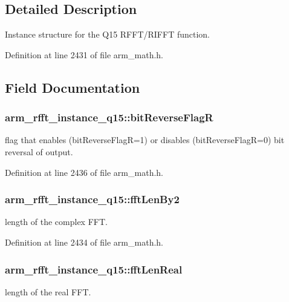 \subsection{Detailed Description}
Instance structure for the Q15 R\-F\-F\-T/\-R\-I\-F\-F\-T function. 

Definition at line 2431 of file arm\-\_\-math.\-h.



\subsection{Field Documentation}
\hypertarget{structarm__rfft__instance__q15_a4c65cd40e0098ec2f5c0dc31488b9bc6}{
\subsubsection[{bit\-Reverse\-Flag\-R}]{ arm\-\_\-rfft\-\_\-instance\-\_\-q15\-::bit\-Reverse\-Flag\-R}}\label{structarm__rfft__instance__q15_a4c65cd40e0098ec2f5c0dc31488b9bc6}
flag that enables (bit\-Reverse\-Flag\-R=1) or disables (bit\-Reverse\-Flag\-R=0) bit reversal of output. 

Definition at line 2436 of file arm\-\_\-math.\-h.

\hypertarget{structarm__rfft__instance__q15_afef95bc722f5929d5e63ecba14fa3ca1}{
\subsubsection[{fft\-Len\-By2}]{ arm\-\_\-rfft\-\_\-instance\-\_\-q15\-::fft\-Len\-By2}}\label{structarm__rfft__instance__q15_afef95bc722f5929d5e63ecba14fa3ca1}
length of the complex F\-F\-T. 

Definition at line 2434 of file arm\-\_\-math.\-h.

\hypertarget{structarm__rfft__instance__q15_aac5cf9e825917cbb14f439e56bb86ab3}{
\subsubsection[{fft\-Len\-Real}]{ arm\-\_\-rfft\-\_\-instance\-\_\-q15\-::fft\-Len\-Real}}\label{structarm__rfft__instance__q15_aac5cf9e825917cbb14f439e56bb86ab3}
length of the real F\-F\-T. 

